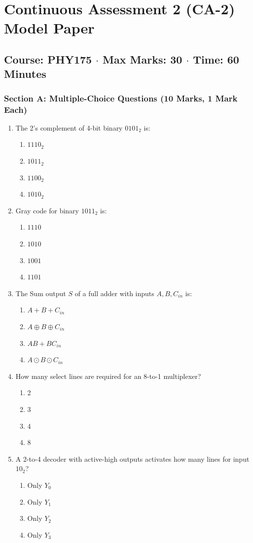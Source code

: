 \chapter{Continuous Assessment 2 (CA-2) Model Paper}
\section*{Course: PHY175 $\cdot$ Max Marks: 30 $\cdot$ Time: 60 Minutes}

\subsection*{Section A: Multiple-Choice Questions (10 Marks, 1 Mark Each)}
\begin{enumerate}[leftmargin=*]
    \item The 2's complement of 4-bit binary $0101_2$ is:
    \begin{enumerate}[label=(\alph*)]
        \item $1110_2$ \item $1011_2$ \item $1100_2$ \item $1010_2$
    \end{enumerate}
    \item Gray code for binary $1011_2$ is:
    \begin{enumerate}[label=(\alph*)]
        \item $1110$ \item $1010$ \item $1001$ \item $1101$
    \end{enumerate}
    \item The Sum output $S$ of a full adder with inputs $A, B, C_{in}$ is:
    \begin{enumerate}[label=(\alph*)]
        \item $A + B + C_{in}$ \item $A \oplus B \oplus C_{in}$ \item $AB + BC_{in}$ \item $A \odot B \odot C_{in}$
    \end{enumerate}
    \item How many select lines are required for an 8-to-1 multiplexer?
    \begin{enumerate}[label=(\alph*)]
        \item 2 \item 3 \item 4 \item 8
    \end{enumerate}
    \item A 2-to-4 decoder with active-high outputs activates how many lines for input $10_2$?
    \begin{enumerate}[label=(\alph*)]
        \item Only $Y_0$ \item Only $Y_1$ \item Only $Y_2$ \item Only $Y_3$
    \end{enumerate}
\end{enumerate}

